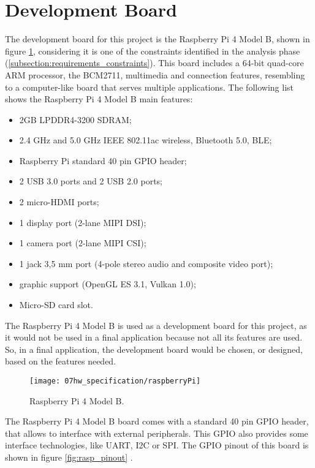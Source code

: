 \section{Development Board}

The development board for this project is the Raspberry Pi 4 Model B, shown in figure \ref{fig:rasp}, considering it is one of the constraints identified in the analysis phase (\ref{subsection:requirements_constraints}). This board includes a 64-bit quad-core ARM processor, the BCM2711, multimedia and connection features, resembling to a computer-like board that serves multiple applications. The following list shows the Raspberry Pi 4 Model B main features:

\begin{itemize}
        \item 2GB LPDDR4-3200 SDRAM;
        \item 2.4 GHz and 5.0 GHz IEEE 802.11ac wireless, Bluetooth 5.0, BLE;
        \item Raspberry Pi standard 40 pin GPIO header;   
        \item 2 USB 3.0 ports and 2 USB 2.0 ports;
        \item 2 micro-HDMI ports;
        \item 1 display port (2-lane MIPI DSI);
        \item 1 camera port (2-lane MIPI CSI);
        \item 1 jack 3,5 mm port (4-pole stereo audio and composite video port);
		\item graphic support (OpenGL ES 3.1, Vulkan 1.0);
		\item Micro-SD card slot.
\end{itemize}

The Raspberry Pi 4 Model B is used as a development board for this project, as it would not be used in a final application because not all its features are used. So, in a final application, the development board would be chosen, or designed, based on the features needed.

\begin{figure}[H]
	\centering
	\texttt{[image: 07hw\_specification/raspberryPi]}
	\caption{Raspberry Pi 4 Model B.}
	\label{fig:rasp}
\end{figure}


The Raspberry Pi 4 Model B board comes with a standard 40 pin GPIO header, that allows to interface with external peripherals. This GPIO also provides some interface technologies, like UART, I2C or SPI. The GPIO pinout of this board is shown in figure \ref{fig:rasp_pinout} \cite{pinout}.

